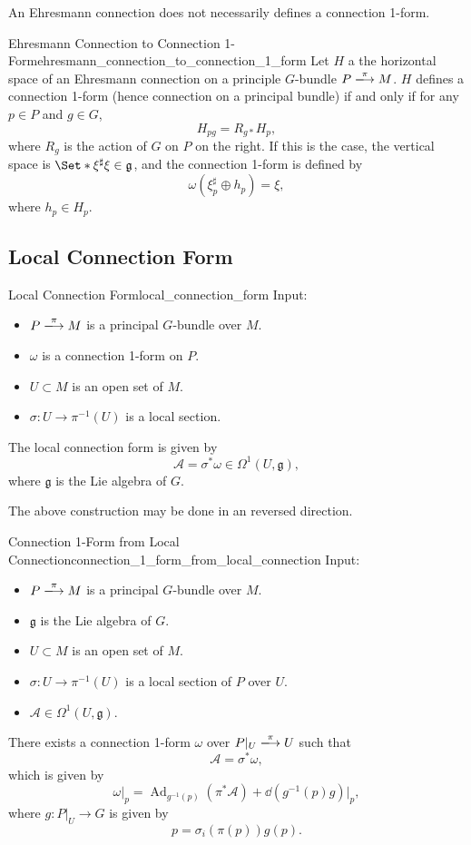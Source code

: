 \documentclass{article}
\begin{document}
An Ehresmann connection does not necessarily defines a connection 1-form.
\begin{proposition}{Ehresmann Connection to Connection 1-Form}{ehresmann_connection_to_connection_1_form}
    Let $H$ a the horizontal space of an Ehresmann connection on a principle $G$-bundle $P\xlongrightarrow{\pi} M$.
    $H$ defines a connection 1-form (hence connection on a principal bundle) if and only if for any $p\in P$ and $g\in G$,
    \[ H_{pg} = R_{g*} H_p, \]
    where $R_g$ is the action of $G$ on $P$ on the right.
    If this is the case, the vertical space is $\Set*{\xi^\sharp}{\xi\in\mathfrak{g}}$,
    and the connection 1-form is defined by
    \[ \omega(\xi^\sharp_p \oplus h_p) = \xi, \]
    where $h_p\in H_p$.
\end{proposition}

\subsection{Local Connection Form}

\begin{definition}{Local Connection Form}{local_connection_form}
    Input:
    \begin{itemize}
        \item $P\xlongrightarrow{\pi} M$ is a principal $G$-bundle over $M$.
        \item $\omega$ is a connection 1-form on $P$.
        \item $U\subset M$ is an open set of $M$.
        \item $\sigma: U \rightarrow \pi^{-1}(U)$ is a local section.
    \end{itemize}
    The local connection form is given by
    \[ \mathcal{A} = \sigma^* \omega \in \Omega^1(U, \mathfrak{g}), \]
    where $\mathfrak{g}$ is the Lie algebra of $G$.
\end{definition}

The above construction may be done in an reversed direction.

\begin{theorem}{Connection 1-Form from Local Connection}{connection_1_form_from_local_connection}
    Input:
    \begin{itemize}
        \item $P\xlongrightarrow{\pi} M$ is a principal $G$-bundle over $M$.
        \item $\mathfrak{g}$ is the Lie algebra of $G$.
        \item $U\subset M$ is an open set of $M$.
        \item $\sigma: U \rightarrow \pi^{-1}(U)$ is a local section of $P$ over $U$.
        \item $\mathcal{A} \in \Omega^1(U, \mathfrak{g})$.
    \end{itemize}
    There exists a connection 1-form $\omega$ over $P\vert_U \xlongrightarrow{\pi} U$ such that
    \[ \mathcal{A} = \sigma^* \omega, \]
    which is given by
    \[ {\omega}\vert_p = \operatorname{Ad}_{g^{-1}(p)}(\pi^* \mathcal{A}) + {\dd{(g^{-1}(p) g)}}\vert_p, \]
    where $g: P\vert_U \rightarrow G$ is given by
    \[ p = \sigma_i(\pi(p))g(p). \]
\end{theorem}
\end{document}
